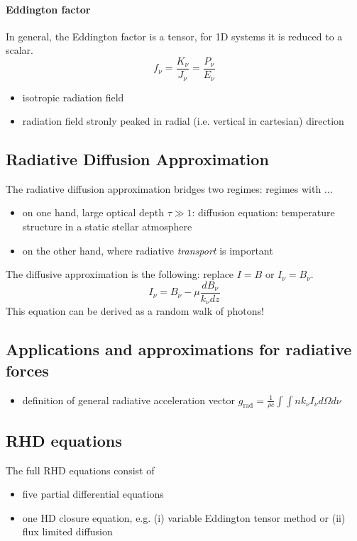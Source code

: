 \documentclass[../main/main.tex]{subfiles}
\begin{document}
\paragraph{Eddington factor}
In general, the Eddington factor is a tensor, for 1D systems it is reduced to a scalar.
\begin{equation}
f_{\nu} = \frac{K_{\nu}}{J_{\nu}} = \frac{P_{\nu}}{E_{\nu}}
\end{equation}
\begin{itemize}
\item isotropic radiation field
\item radiation field stronly peaked in radial (i.e. vertical in cartesian) direction
\end{itemize}



\subsection{Radiative Diffusion Approximation} The radiative diffusion approximation bridges two regimes: regimes with ... 
\begin{itemize}
\item on one hand, large optical depth $\tau \gg 1$: diffusion equation: temperature structure in a static stellar atmosphere
\item on the other hand, where radiative \textit{transport} is important
\end{itemize}
The diffusive approximation is the following: replace $\boxed{I = B}$ or $I_{\nu} = B_{\nu}$.
\begin{equation}
I_{\nu} = B_{\nu} - \mu \frac{dB_{\nu}}{k_{\nu}dz}
\end{equation}
This equation can be derived as a random walk of photons!


\subsection{Applications and approximations for radiative forces}
\begin{itemize}
\item definition of general radiative acceleration vector $g_{\text{rad}} = \frac{1}{\rho c}\int \int n k_{\nu} I_{\nu} d\Omega d\nu$
\end{itemize}

\subsection{RHD equations}
The full RHD equations consist of 
\begin{itemize}
\item five partial differential equations
\item one HD closure equation, e.g. (i) variable Eddington tensor method or (ii) flux limited diffusion
\end{itemize}
\end{document}
